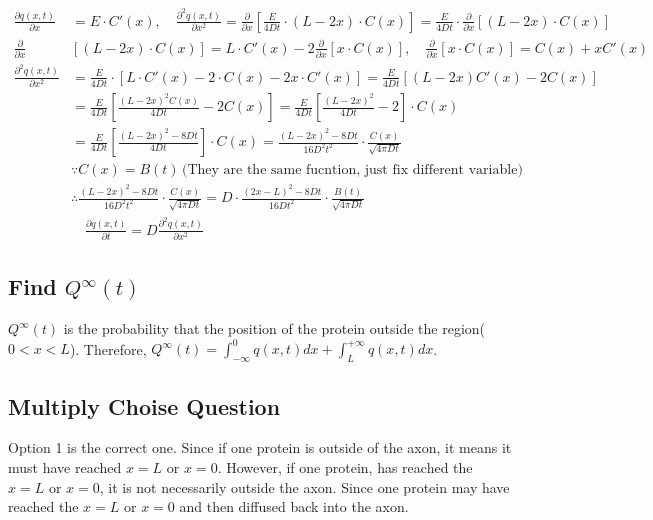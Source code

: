 \begin{align*}
    \frac{\partial q(x, t)}{\partial x} &= E \cdot C'(x), \quad
    \frac{\partial^2 q(x, t)}{\partial x^2} =\frac{\partial}{\partial x} \left[ \frac{E}{4Dt} \cdot (L-2x) \cdot C(x) \right]
    = \frac{E}{4Dt} \cdot \frac{\partial}{\partial x} \left[(L-2x) \cdot C(x) \right]\\
    \frac{\partial}{\partial x} &\left[(L-2x) \cdot C(x) \right] = L \cdot C'(x) - 2 \frac{\partial}{\partial x}[x\cdot C(x)] , \quad
    \frac{\partial}{\partial x}[x\cdot C(x)] = C(x) + x C'(x)\\
    \frac{\partial^2 q(x, t)}{\partial x^2} &= \frac{E}{4Dt} \cdot [L \cdot C'(x) - 2 \cdot C(x) - 2x\cdot C'(x)]
    = \frac{E}{4Dt} [(L-2x)C'(x) - 2C(x)]\\
    &= \frac{E}{4Dt} \left[\frac{(L-2x)^2 C(x)}{4Dt} - 2C(x)\right]
    = \frac{E}{4Dt} \left[\frac{(L-2x)^2}{4Dt} - 2\right] \cdot C(x)\\
    &= \frac{E}{4Dt} \left[\frac{(L-2x)^2 - 8Dt}{4Dt}\right] \cdot C(x)
    = \frac{(L-2x)^2 - 8Dt}{16D^2t^2} \cdot \frac{C(x)}{\sqrt{{4\pi Dt}}}\\
    &\because C(x) = B(t) \, \text{(They are the same fucntion, just fix different variable)}\\
    &\therefore \frac{(L-2x)^2 - 8Dt}{16D^2t^2} \cdot \frac{C(x)}{\sqrt{{4\pi Dt}}} = D \cdot \frac{(2x - L)^2 - 8Dt}{16Dt^2} \cdot \frac{B(t)}{\sqrt{4 \pi D t}}\\
    & \quad \frac{\partial q(x, t)}{\partial t} = D \frac{\partial^2 q(x, t)}{\partial x^2}
\end{align*}

\subsection{Find $Q^{\infty}(t)$}
$Q^{\infty}(t)$ is the probability that the position of the 
protein outside the region($0<x<L$).
Therefore, $Q^{\infty}(t) = \int_{-\infty}^{0} q(x,t)dx + \int_{L}^{+ \infty} q(x,t)dx$. 


\subsection{Multiply Choise Question}

Option 1 is the correct one. 
Since if one protein is outside of the axon, 
it means it must have reached $x=L$ or $x=0$. 
However, 
if one protein, 
has reached the $x=L$ or $x=0$, 
it is not necessarily outside the axon. 
Since one protein may have reached 
the $x=L$ or $x=0$ and then diffused back into the axon. 

